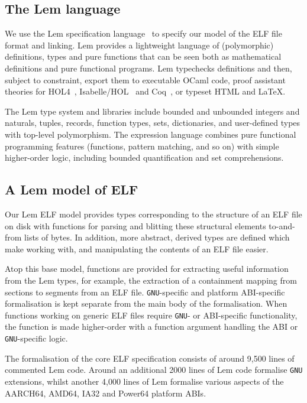 \subsection{The Lem language}
\label{subsect.rigorous.lem.specification}

We use the Lem specification language~\cite{mulligan-lem-2014} to specify our model of the ELF file format and linking.
Lem provides a lightweight language of (polymorphic) definitions, types and pure functions that can be seen both as mathematical definitions and pure functional programs.
Lem typechecks definitions and then, subject to constraint, export them to executable OCaml code, proof assistant theories for HOL4~\cite{slind-brief-2008}, Isabelle/HOL~\cite{wenzel-isabelle-2008} and Coq~\cite{bertot-short-2008}, or typeset HTML and LaTeX.

The Lem type system and libraries include bounded and unbounded integers and naturals, tuples, records, function types, sets, dictionaries, and user-defined types with top-level polymorphism.
The expression language combines pure functional programming features (functions, pattern matching, and so on) with simple higher-order logic, including bounded quantification and set comprehensions.

\subsection{A Lem model of ELF}
\label{subsect.lem.model.of.elf}

Our Lem ELF model provides types corresponding to the structure of an ELF file on disk with functions for parsing and blitting these structural elements to-and-from lists of bytes.
In addition, more abstract, derived types are defined which make working with, and manipulating the contents of an ELF file easier.

Atop this base model, functions are provided for extracting useful information from the Lem types, for example, the extraction of a containment mapping from sections to segments from an ELF file.
\texttt{GNU}-specific and platform ABI-specific formalisation is kept separate from the main body of the formalisation.
When functions working on generic ELF files require \texttt{GNU}- or ABI-specific functionality, the function is made higher-order with a function argument handling the ABI or \texttt{GNU}-specific logic.

The formalisation of the core ELF specification consists of around 9,500 lines of commented Lem code.
Around an additional 2000 lines of Lem code formalise \texttt{GNU} extensions, whilst another 4,000 lines of Lem formalise various aspects of the AARCH64, AMD64, IA32 and Power64 platform ABIs.

